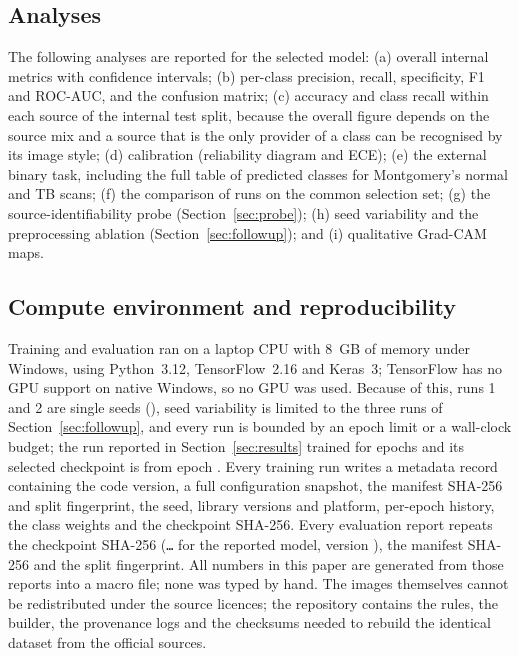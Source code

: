\subsection{Analyses}
The following analyses are reported for the selected model: (a) overall internal metrics with confidence intervals; (b) per-class precision, recall, specificity, F1 and ROC-AUC, and the confusion matrix; (c) accuracy and class recall within each source of the internal test split, because the overall figure depends on the source mix and a source that is the only provider of a class can be recognised by its image style; (d) calibration (reliability diagram and ECE); (e) the external binary task, including the full table of predicted classes for Montgomery's normal and TB scans; (f) the comparison of runs on the common selection set; (g) the source-identifiability probe (Section~\ref{sec:probe}); (h) seed variability and the preprocessing ablation (Section~\ref{sec:followup}); and (i) qualitative Grad-CAM maps.

\subsection{Compute environment and reproducibility}
Training and evaluation ran on a laptop CPU with 8~GB of memory under Windows, using Python~3.12, TensorFlow~2.16 and Keras~3; TensorFlow has no GPU support on native Windows, so no GPU was used. Because of this, runs 1 and 2 are single seeds (\RSeed), seed variability is limited to the three runs of Section~\ref{sec:followup}, and every run is bounded by an epoch limit or a wall-clock budget; the run reported in Section~\ref{sec:results} trained for \REpochsTrained{} epochs and its selected checkpoint is from epoch \RSelectedEpoch. Every training run writes a metadata record containing the code version, a full configuration snapshot, the manifest SHA-256 and split fingerprint, the seed, library versions and platform, per-epoch history, the class weights and the checkpoint SHA-256. Every evaluation report repeats the checkpoint SHA-256 (\texttt{\RCheckpointShort\ldots} for the reported model, version \RModelVersion), the manifest SHA-256 and the split fingerprint. All numbers in this paper are generated from those reports into a macro file; none was typed by hand. The images themselves cannot be redistributed under the source licences; the repository contains the rules, the builder, the provenance logs and the checksums needed to rebuild the identical dataset from the official sources.

